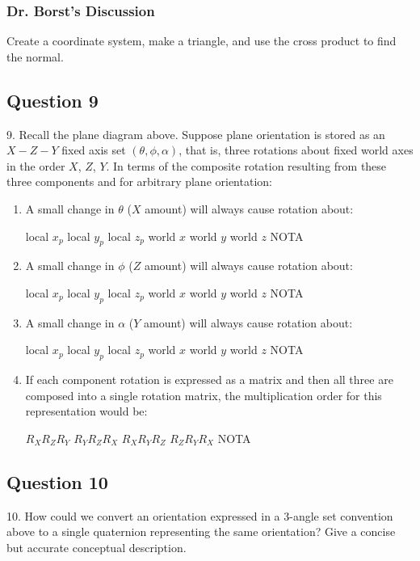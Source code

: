 \documentclass[11pt]{article}
\begin{document}
\begin{spacing}{1.2}
\subsubsection{Dr. Borst's Discussion}

Create a coordinate system, make a triangle, and use the cross product to find the normal.  

\subsection{Question 9}
9.  Recall the plane diagram above.  Suppose plane orientation is stored as an $X-Z-Y$ fixed axis set $(\theta, \phi, \alpha)$, that is, three rotations about fixed world axes in the order $X$, $Z$, $Y$.  In terms of the composite rotation resulting from these three components and for arbitrary plane orientation:

\begin{enumerate}[label=\arabic*)]
	\item A small change in $\theta$ ($X$ amount) will always cause rotation about:
	
	local $x_p$ \qquad local $y_p$ \qquad local $z_p$ \qquad world $x$ \qquad world $y$ \qquad world $z$ \qquad NOTA
	\item A small change in $\phi$ ($Z$ amount) will always cause rotation about:
	
	local $x_p$ \qquad local $y_p$ \qquad local $z_p$ \qquad world $x$ \qquad world $y$ \qquad world $z$ \qquad NOTA
	
	\item A small change in $\alpha$ ($Y$ amount) will always cause rotation about:
	
	local $x_p$ \qquad local $y_p$ \qquad local $z_p$ \qquad world $x$ \qquad world $y$ \qquad world $z$ \qquad NOTA
	\item If each component rotation is expressed as a matrix and then all three are composed into a single rotation matrix, the multiplication order for this representation would be:
	
	$R_XR_ZR_Y$ \qquad
	$R_YR_ZR_X$ \qquad
	$R_XR_YR_Z$ \qquad
	$R_ZR_YR_X$ \qquad
	NOTA
\end{enumerate}

\subsection{Question 10}
10.  How could we convert an orientation expressed in a 3-angle set convention above to a single quaternion representing the same orientation?  Give a concise but accurate conceptual description.


\end{spacing}
\end{document}
